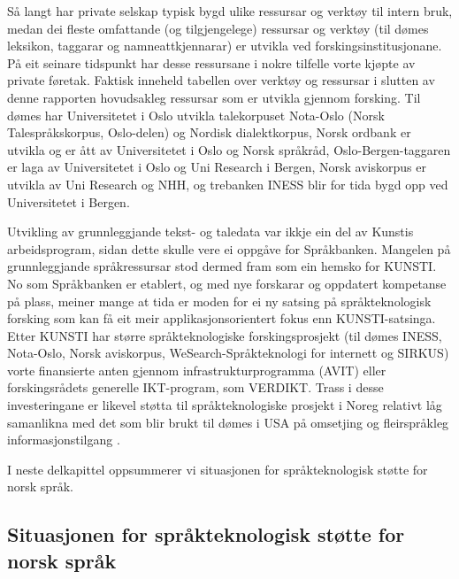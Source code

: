 \begin{multicols}{2}
Så langt har private selskap typisk bygd ulike ressursar og verktøy til intern bruk, medan dei fleste omfattande (og tilgjengelege) ressursar og verktøy (til dømes leksikon, taggarar og namneattkjennarar) er utvikla ved forskingsinstitusjonane. På eit seinare tidspunkt har desse ressursane i nokre tilfelle vorte kjøpte av private føretak. Faktisk inneheld tabellen over verktøy og ressursar i slutten av denne rapporten hovudsakleg ressursar som er utvikla gjennom forsking. Til dømes har Universitetet i Oslo utvikla talekorpuset Nota-Oslo (Norsk Talespråkskorpus, Oslo-delen) og Nordisk dialektkorpus, Norsk ordbank er utvikla og er ått av Universitetet i Oslo og Norsk språkråd, Oslo-Bergen-taggaren er laga av Universitetet i Oslo og Uni Research i Bergen, Norsk aviskorpus er utvikla av Uni Research og NHH, og trebanken INESS blir for tida bygd opp ved Universitetet i Bergen.

Utvikling av grunnleggjande tekst- og taledata var ikkje ein del av Kunstis arbeidsprogram, sidan dette skulle vere ei oppgåve for Språkbanken. Mangelen på grunnleggjande språkressursar stod dermed fram som ein hemsko for KUNSTI. No som Språkbanken er etablert, og med nye forskarar og oppdatert kompetanse på plass, meiner mange at tida er moden for ei ny satsing på språkteknologisk forsking som kan få eit meir applikasjonsorientert fokus enn KUNSTI-satsinga. Etter KUNSTI har større språkteknologiske forskingsprosjekt (til dømes INESS, Nota-Oslo, Norsk aviskorpus, WeSearch-Språkteknologi for internett og SIRKUS) vorte finansierte anten gjennom infrastrukturprogramma (AVIT) eller forskingsrådets generelle IKT-program, som VERDIKT. 
Trass i desse investeringane er likevel støtta til språkteknologiske prosjekt i Noreg relativt låg samanlikna med det som blir brukt til dømes i USA på omsetjing og fleirspråkleg informasjonstilgang \cite{laz1}.

I neste delkapittel oppsummerer vi situasjonen for språkteknologisk støtte for norsk språk. 

\subsection{Situasjonen for språkteknologisk støtte for norsk språk}


\end{multicols}
